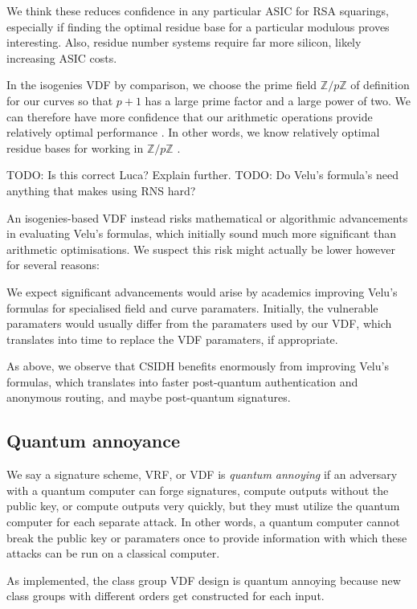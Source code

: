 \documentclass{article}
\newcommand{\Z}{\mathbb{Z}}
\begin{document}
We think these reduces confidence in any particular ASIC for RSA
squarings, especially if finding the optimal residue base for a
particular modulous proves interesting.  Also, residue number systems
require far more silicon, likely increasing ASIC costs.

In the isogenies VDF by comparison, we choose the prime field $\Z/p\Z$
of definition for our curves so that $p+1$ has a large prime factor
and a large power of two.  
We can therefore have more confidence that our arithmetic operations
provide relatively optimal performance \cite{????}.  In other words,
we know relatively optimal residue bases for working in $\Z/p\Z$ \cite{????}.

TODO: Is this correct Luca?  Explain further.  
TODO: Do Velu's formula's need anything that makes using RNS hard?

An isogenies-based VDF instead risks mathematical or algorithmic
advancements in evaluating Velu's formulas, which initially sound
much more significant than arithmetic optimisations.  We suspect
this risk might actually be lower however for several reasons:

We expect significant advancements would arise by academics improving
Velu's formulas for specialised field and curve paramaters.
Initially, the vulnerable paramaters would usually differ from the
paramaters used by our VDF, which translates into time to replace
the VDF paramaters, if appropriate.  

As above, we observe that CSIDH \cite{CSIDH} benefits enormously from
improving Velu's formulas, which translates into faster post-quantum
authentication and anonymous routing, and maybe post-quantum signatures.

\subsection{Quantum annoyance}

We say a signature scheme, VRF, or VDF is {\em quantum annoying} if
an adversary with a quantum computer can forge signatures, compute
outputs without the public key, or compute outputs very quickly,
but they must utilize the quantum computer for each separate attack.
In other words, a quantum computer cannot break the public key or
paramaters once to provide information with which these attacks can
be run on a classical computer. 

As implemented, the class group VDF design is quantum annoying because
new class groups with different orders get constructed for each input.
\end{document}
